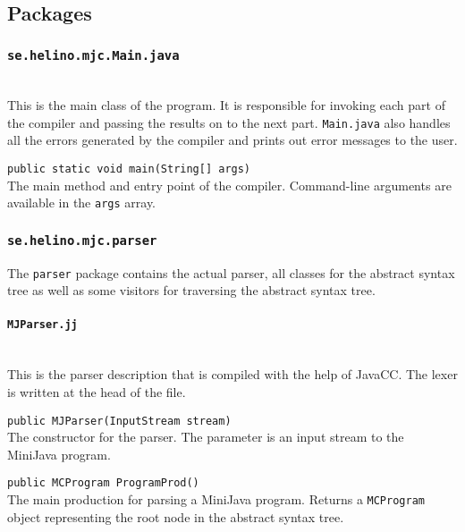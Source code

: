 \documentclass[11pt,oneside,a4paper]{article}
\begin{document}
\subsection{Packages}
\subsubsection{\texttt{se.helino.mjc.Main.java}} \hfill \\
This is the main class of the program. It is responsible for invoking each part
of the compiler and passing the results on to the next part. \texttt{Main.java} 
also handles all the errors generated by the compiler and prints out error
messages to the user.
\begin{description}
    \item{\texttt{public static void main(String[] args)}} \hfill \\
        The main method and entry point of the compiler. Command-line arguments
        are available in the \texttt{args} array.
\end{description}

\subsubsection{\texttt{se.helino.mjc.parser}}
The \texttt{parser} package contains the actual parser, all classes for the 
abstract syntax tree as well as some visitors for traversing the abstract 
syntax tree.

\paragraph{\texttt{MJParser.jj}} \hfill \\
This is the parser description that is compiled with the help of JavaCC. The
lexer is written at the head of the file.
\begin{description}
    \item{\texttt{public MJParser(InputStream stream)}} \hfill \\
        The constructor for the parser. The parameter is an input stream to the
        MiniJava program.

    \item{\texttt{public MCProgram ProgramProd()}} \hfill \\
        The main production for parsing a MiniJava program. Returns a
        \texttt{MCProgram}
        object representing the root node in the abstract syntax tree.
\end{description}
\end{document}
